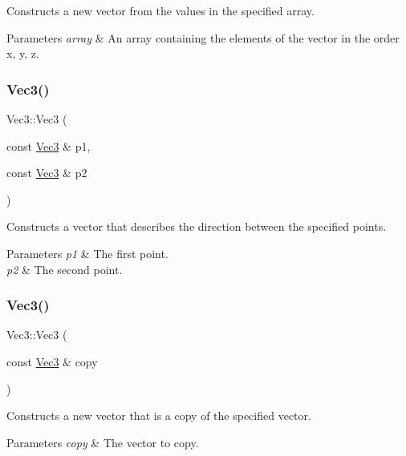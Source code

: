 Constructs a new vector from the values in the specified array.


\begin{DoxyParams}{Parameters}
{\em array} & An array containing the elements of the vector in the order x, y, z. \\
\hline
\end{DoxyParams}
\mbox{\label{classVec3_a565e372bc20d212a9f4724b9bb92f8d0}} 
\subsubsection{\texorpdfstring{Vec3()}{Vec3()}\hspace{0.1cm}{\footnotesize\ttfamily [4/9]}}
{\footnotesize\ttfamily Vec3\+::\+Vec3 (\begin{DoxyParamCaption}\item[{const \hyperlink{classVec3}{Vec3} \&}]{p1,  }\item[{const \hyperlink{classVec3}{Vec3} \&}]{p2 }\end{DoxyParamCaption})}

Constructs a vector that describes the direction between the specified points.


\begin{DoxyParams}{Parameters}
{\em p1} & The first point. \\
\hline
{\em p2} & The second point. \\
\hline
\end{DoxyParams}
\mbox{\label{classVec3_aa1cc33c5de48f8550cbd4f05c7dcccff}} 
\subsubsection{\texorpdfstring{Vec3()}{Vec3()}\hspace{0.1cm}{\footnotesize\ttfamily [5/9]}}
{\footnotesize\ttfamily Vec3\+::\+Vec3 (\begin{DoxyParamCaption}\item[{const \hyperlink{classVec3}{Vec3} \&}]{copy }\end{DoxyParamCaption})}

Constructs a new vector that is a copy of the specified vector.


\begin{DoxyParams}{Parameters}
{\em copy} & The vector to copy. \\
\hline
\end{DoxyParams}
\mbox{\label{classVec3_a1f5422fc4645496196292fa5314ef77c}} 
